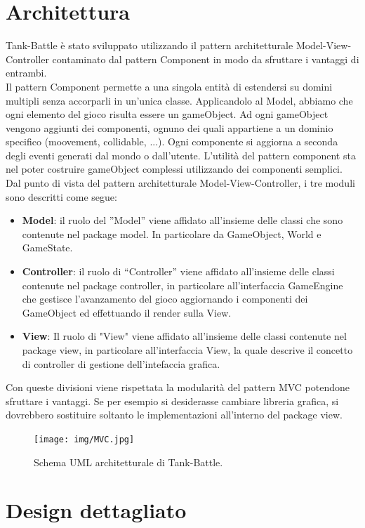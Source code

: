 \documentclass[a4paper,12pt]{report}
\begin{document}
\section{Architettura}
Tank-Battle è stato sviluppato utilizzando il pattern architetturale Model-View-Controller contaminato dal pattern Component in modo da sfruttare i vantaggi di entrambi.\\
Il pattern Component permette a una singola entità di estendersi su domini multipli senza accorparli in un’unica classe. Applicandolo al Model, abbiamo che ogni elemento del gioco risulta essere un gameObject. Ad ogni gameObject vengono aggiunti dei componenti, ognuno dei quali appartiene a un dominio specifico (moovement, collidable, ...). Ogni componente si aggiorna a seconda degli eventi generati dal mondo o dall’utente. L'utilità del pattern component sta nel poter costruire gameObject complessi utilizzando dei componenti semplici.\\
Dal punto di vista del pattern architetturale Model-View-Controller, i tre moduli sono descritti come segue: 
\begin{itemize}
	\item \textbf{Model}:
	il ruolo del ”Model” viene affidato all’insieme delle classi che sono contenute nel package model. In particolare da GameObject, World e GameState.
	\item \textbf{Controller}:
	il ruolo di “Controller” viene affidato all’insieme delle classi contenute nel package controller, in particolare all'interfaccia GameEngine che gestisce l’avanzamento del gioco aggiornando i componenti dei GameObject ed effettuando il render sulla View.
	\item \textbf{View}:
	Il ruolo di "View" viene affidato all’insieme delle classi contenute nel package view, in particolare all’interfaccia View, la quale descrive il concetto di controller di gestione dell'intefaccia grafica.
\end{itemize}
\newpage Con queste divisioni viene rispettata la modularità del pattern MVC potendone sfruttare i vantaggi. Se per esempio si desiderasse cambiare libreria grafica, si dovrebbero sostituire soltanto le implementazioni all’interno del package view.
	
\begin{figure}[H]
\centering{}
\texttt{[image: img/MVC.jpg]}
\caption{Schema UML architetturale di Tank-Battle.}
\label{img:analysis}
\end{figure}

\section{Design dettagliato}
%
\end{document}
